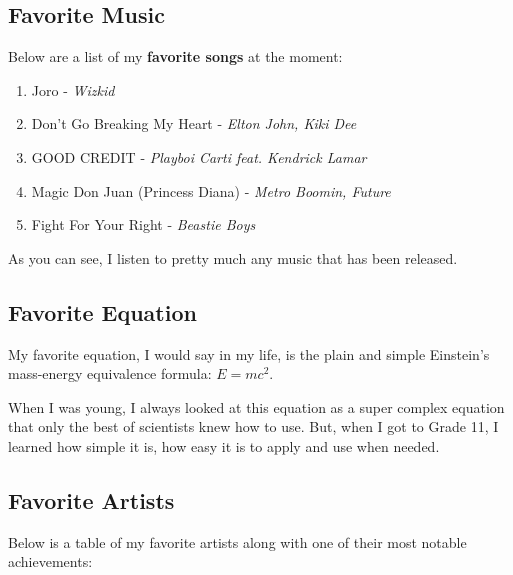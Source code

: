 \documentclass[
]{article}
\providecommand{\tightlist}{%
  \setlength{\itemsep}{0pt}\setlength{\parskip}{0pt}}
\begin{document}
\subsection{Favorite Music}\label{favorite-music}

Below are a list of my \textbf{favorite songs} at the moment:

\begin{enumerate}
\def\labelenumi{\arabic{enumi}.}
\tightlist
\item
  Joro - \emph{Wizkid}
\item
  Don't Go Breaking My Heart - \emph{Elton John, Kiki Dee}
\item
  GOOD CREDIT - \emph{Playboi Carti feat. Kendrick Lamar}
\item
  Magic Don Juan (Princess Diana) - \emph{Metro Boomin, Future}
\item
  Fight For Your Right - \emph{Beastie Boys}
\end{enumerate}

As you can see, I listen to pretty much any music that has been
released.

\subsection{Favorite Equation}\label{favorite-equation}

My favorite equation, I would say in my life, is the plain and simple
Einstein's mass-energy equivalence formula: \(E = mc^2\).

When I was young, I always looked at this equation as a super complex
equation that only the best of scientists knew how to use. But, when I
got to Grade 11, I learned how simple it is, how easy it is to apply and
use when needed.

\subsection{Favorite Artists}\label{favorite-artists}

Below is a table of my favorite artists along with one of their most
notable achievements:
\end{document}
